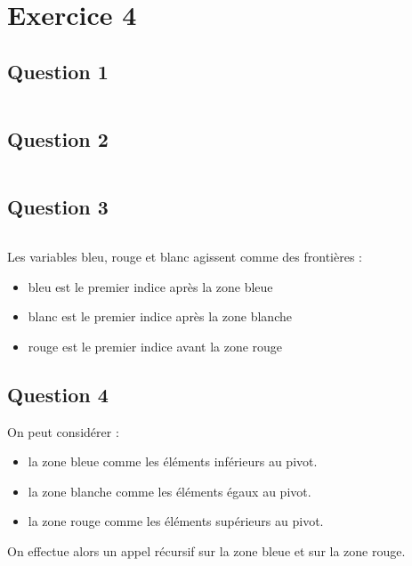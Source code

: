 \documentclass[td7.tex]{subfiles}
\begin{document}
\section*{Exercice 4}
\subsection*{Question 1}
\inputminted[mathescape, firstline=31, lastline=39]{python}{problemeDrapeauHollandais.py}

\subsection*{Question 2}
\inputminted[mathescape, firstline=41, lastline=47]{python}{problemeDrapeauHollandais.py}

\subsection*{Question 3}
\inputminted[mathescape, firstline=49, lastline=61]{python}{problemeDrapeauHollandais.py}
Les variables bleu, rouge et blanc agissent comme des frontières :
\begin{itemize}
\item bleu est le premier indice après la zone bleue
\item blanc est le premier indice après la zone blanche
\item rouge est le premier indice avant la zone rouge
\end{itemize}

\subsection*{Question 4}
On peut considérer :

\begin{itemize}
\item la zone bleue comme les éléments inférieurs au pivot.
\item la zone blanche comme les éléments égaux au pivot.
\item la zone rouge comme les éléments supérieurs au pivot.
\end{itemize}
On effectue alors un appel récursif sur la zone bleue et sur la zone rouge.

\inputminted[firstline=63, lastline=88]{python}{problemeDrapeauHollandais.py}
\end{document}
